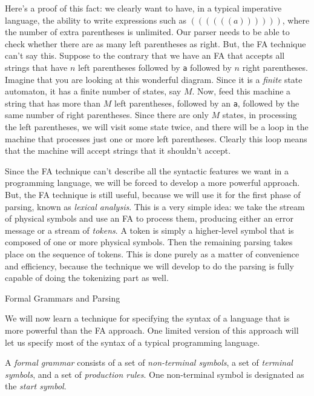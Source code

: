 \In
   Here's a proof of this fact:  we clearly want to have, in a typical
   imperative language, the ability to write expressions
   such as $((((((a))))))$, where the number of extra parentheses is unlimited.  Our parser needs
   to be able to check whether there are as many left parentheses as right.  But, the FA technique
   can't say this.  Suppose to the contrary that we have an FA that accepts all strings that
   have $n$ left parentheses followed by {\tt a} followed by $n$ right parentheses.  Imagine that
   you are looking at this wonderful diagram.  Since it is a {\it finite\/} state automaton, it has a
   finite number of states, say $M$.  Now, feed this machine a string that has more than $M$
   left parentheses, followed by an {\tt a}, followed by the same number of right parentheses.
   Since there are only $M$ states, in processing the left parentheses, we will visit some state
   twice, and there will be a loop in the machine that processes just one or more left parentheses.
   Clearly this loop means that the machine will accept strings that it shouldn't accept.
\medskip
\Out

Since the FA technique can't describe all the syntactic features we want in a programming 
language, we will be forced to develop a more powerful approach.  But, the FA technique
is still useful, because we will use it for the first phase of parsing, known as {\it lexical analysis}.
This is a very simple idea:  we take the stream of physical symbols and use an FA to
process them, producing either an error message or a stream of {\it tokens}.  A token is simply
a higher-level symbol that is composed of one or more physical symbols.  Then the
remaining parsing takes place on the sequence of tokens.   This is done purely as a
matter of convenience and efficiency, because the technique we will develop to do the parsing
is fully capable of doing the tokenizing part as well.
\border

\vfil\eject

{\bigboldfont  Formal Grammars and Parsing}
\medskip

We will now learn a technique for specifying the syntax of a language that is more powerful
than the FA approach.  One limited version of this approach will let us specify most of the
syntax of a typical programming language.
\bigskip

A {\it formal grammar\/} consists of a set of {\it non-terminal symbols}, a set of {\it terminal symbols},
and a set of {\it production rules}.  One non-terminal symbol is designated as the {\it start symbol}.
\medskip

